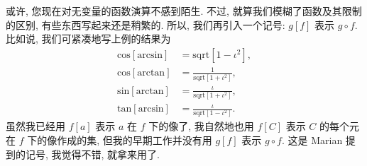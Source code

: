 \begin{remark}
    或许, 您现在对无变量的函数演算不感到陌生.
    不过, 就算我们模糊了函数及其限制的区别,
    有些东西写起来还是稍繁的.
    所以, 我们再引入一个记号:
    $g[f]$ 表示 $g \circ f$.
    比如说, 我们可紧凑地写上例的结果为
    \begin{align*}
        \mathrm{cos} [\mathrm{arcsin}]
         & = \mathrm{sqrt} [1 - \iota^2],               \\
        \mathrm{cos} [\mathrm{arctan}]
         & = \frac{1}{\mathrm{sqrt} [1 + \iota^2]},     \\
        \mathrm{sin} [\mathrm{arctan}]
         & = \frac{\iota}{\mathrm{sqrt} [1 + \iota^2]}, \\
        \mathrm{tan} [\mathrm{arcsin}]
         & = \frac{\iota}{\mathrm{sqrt} [1 - \iota^2]}.
    \end{align*}
    虽然我已经用 $f[a]$ 表示 $a$ 在 $f$ 下的像了,
    我自然地也用 $f[C]$ 表示 $C$ 的每个元%
    在 $f$ 下的像作成的集,
    但我的早期工作并没有用 $g[f]$ 表示 $g \circ f$.
    这是 Marian 提到的记号, 我觉得不错, 就拿来用了.
\end{remark}
